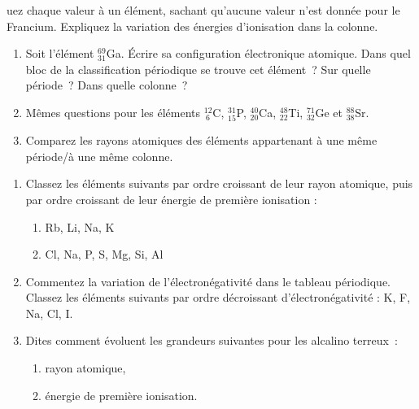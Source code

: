 uez chaque valeur \`a un \'el\'ement, sachant qu'aucune valeur n'est donn\'ee pour le Francium. Expliquez la variation des \'energies d'ionisation dans la colonne.
\begin{enumerate}[\bf 1)]
\item Soit l'\'el\'ement $_{31}^{69}$Ga. \'Ecrire sa configuration \'electronique atomique.
Dans quel bloc de la classification p\'eriodique se trouve cet \'el\'ement~?
Sur quelle p\'eriode~?
Dans quelle colonne~?
\item M\^emes questions pour les \'el\'ements $_{~6}^{12}$C, $_{15}^{31}$P, $_{20}^{40}$Ca, 
$_{22}^{48}$Ti, $_{32}^{71}$Ge et $_{38}^{88}$Sr.
\item Comparez les rayons atomiques des \'el\'ements appartenant \`a une m\^eme p\'eriode/\`a une m\^eme colonne.
\end{enumerate}
\begin{enumerate}[\bf 1)]
\item Classez les \'el\'ements suivants par ordre croissant de leur rayon atomique, puis par ordre croissant
de leur énergie de première ionisation :
\begin{enumerate}%
\item Rb, Li, Na, K
\item Cl, Na, P, S, Mg, Si, Al
\end{enumerate}
\item Commentez la variation de l'\'electron\'egativit\'e dans le tableau p\'eriodique. Classez les \'el\'ements suivants par ordre d\'ecroissant d'\'electron\'egativit\'e : K, F, Na, Cl, I.
\item Dites comment \'evoluent les grandeurs suivantes pour les alcalino terreux~:
\begin{enumerate}%
\item rayon atomique,
\item \'energie de premi\`ere ionisation.
\end{enumerate}
\end{enumerate}
%
